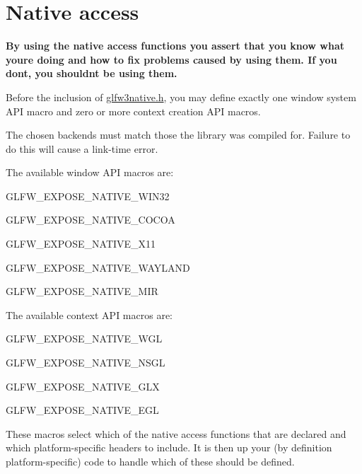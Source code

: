 \hypertarget{group__native}{}\section{Native access}
\label{group__native}
{\bfseries By using the native access functions you assert that you know what you\textquotesingle{}re doing and how to fix problems caused by using them. If you don\textquotesingle{}t, you shouldn\textquotesingle{}t be using them.}

Before the inclusion of \hyperlink{glfw3native_8h}{glfw3native.\+h}, you may define exactly one window system A\+PI macro and zero or more context creation A\+PI macros.

The chosen backends must match those the library was compiled for. Failure to do this will cause a link-\/time error.

The available window A\+PI macros are\+:
\begin{DoxyItemize}
\item {\ttfamily G\+L\+F\+W\+\_\+\+E\+X\+P\+O\+S\+E\+\_\+\+N\+A\+T\+I\+V\+E\+\_\+\+W\+I\+N32}
\item {\ttfamily G\+L\+F\+W\+\_\+\+E\+X\+P\+O\+S\+E\+\_\+\+N\+A\+T\+I\+V\+E\+\_\+\+C\+O\+C\+OA}
\item {\ttfamily G\+L\+F\+W\+\_\+\+E\+X\+P\+O\+S\+E\+\_\+\+N\+A\+T\+I\+V\+E\+\_\+\+X11}
\item {\ttfamily G\+L\+F\+W\+\_\+\+E\+X\+P\+O\+S\+E\+\_\+\+N\+A\+T\+I\+V\+E\+\_\+\+W\+A\+Y\+L\+A\+ND}
\item {\ttfamily G\+L\+F\+W\+\_\+\+E\+X\+P\+O\+S\+E\+\_\+\+N\+A\+T\+I\+V\+E\+\_\+\+M\+IR}
\end{DoxyItemize}

The available context A\+PI macros are\+:
\begin{DoxyItemize}
\item {\ttfamily G\+L\+F\+W\+\_\+\+E\+X\+P\+O\+S\+E\+\_\+\+N\+A\+T\+I\+V\+E\+\_\+\+W\+GL}
\item {\ttfamily G\+L\+F\+W\+\_\+\+E\+X\+P\+O\+S\+E\+\_\+\+N\+A\+T\+I\+V\+E\+\_\+\+N\+S\+GL}
\item {\ttfamily G\+L\+F\+W\+\_\+\+E\+X\+P\+O\+S\+E\+\_\+\+N\+A\+T\+I\+V\+E\+\_\+\+G\+LX}
\item {\ttfamily G\+L\+F\+W\+\_\+\+E\+X\+P\+O\+S\+E\+\_\+\+N\+A\+T\+I\+V\+E\+\_\+\+E\+GL}
\end{DoxyItemize}

These macros select which of the native access functions that are declared and which platform-\/specific headers to include. It is then up your (by definition platform-\/specific) code to handle which of these should be defined. 
